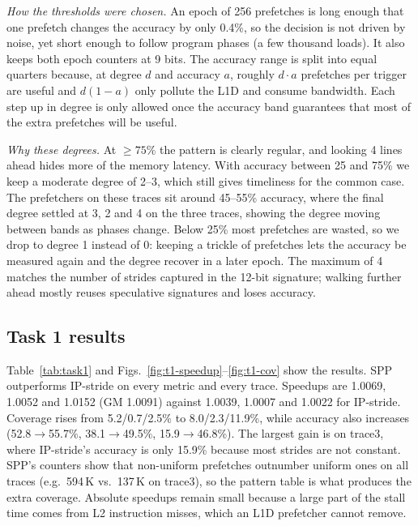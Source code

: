 \documentclass[conference]{IEEEtran}
\begin{document}
\emph{How the thresholds were chosen.} An epoch of 256 prefetches is long
enough that one prefetch changes the accuracy by only 0.4\%, so the decision
is not driven by noise, yet short enough to follow program phases (a few
thousand loads). It also keeps both epoch counters at 9 bits. The accuracy
range is split into equal quarters because, at degree $d$ and accuracy $a$,
roughly $d\cdot a$ prefetches per trigger are useful and $d(1-a)$ only pollute
the L1D and consume bandwidth. Each step up in degree is only allowed once the
accuracy band guarantees that most of the extra prefetches will be useful.

\emph{Why these degrees.} At $\geq 75\%$ the pattern is clearly regular, and
looking 4 lines ahead hides more of the memory latency. With accuracy between
25 and 75\% we keep a moderate degree of 2--3, which still gives timeliness
for the common case. The prefetchers on these traces sit around 45--55\%
accuracy, where the final degree settled at 3, 2 and 4 on the three traces,
showing the degree moving between bands as phases change. Below 25\% most
prefetches are wasted, so we drop to degree 1 instead of 0: keeping a trickle
of prefetches lets the accuracy be measured again and the degree recover in a
later epoch. The maximum of 4 matches the number of strides captured in the
12-bit signature; walking further ahead mostly reuses speculative signatures
and loses accuracy.

\subsection{Task 1 results}
Table~\ref{tab:task1} and Figs.~\ref{fig:t1-speedup}--\ref{fig:t1-cov} show
the results. SPP outperforms IP-stride on every metric and every trace.
Speedups are 1.0069, 1.0052 and 1.0152 (GM 1.0091) against 1.0039, 1.0007 and
1.0022 for IP-stride. Coverage rises from 5.2/0.7/2.5\% to 8.0/2.3/11.9\%,
while accuracy also increases (52.8$\rightarrow$55.7\%,
38.1$\rightarrow$49.5\%, 15.9$\rightarrow$46.8\%). The largest gain is on
trace3, where IP-stride's accuracy is only 15.9\% because most strides are not
constant. SPP's counters show that non-uniform prefetches outnumber uniform
ones on all traces (e.g.\ 594\,K vs.\ 137\,K on trace3), so the pattern table is
what produces the extra coverage. Absolute speedups remain small because a
large part of the stall time comes from L2 instruction misses, which an L1D
prefetcher cannot remove.


\end{document}
